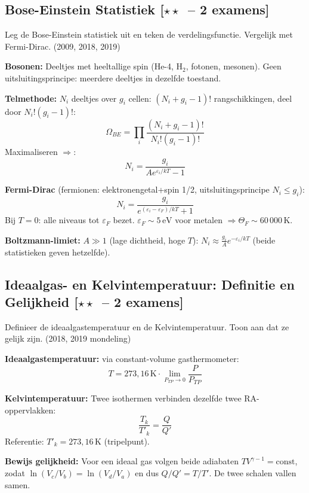 \documentclass[10pt,a4paper]{article}
\begin{document}
\subsection{Bose-Einstein Statistiek \textnormal{\color{warningred}[$\star\star$\ -- 2 examens]}}

\begin{theorievraag}{Leg de Bose-Einstein statistiek uit en teken de verdelingsfunctie. Vergelijk met Fermi-Dirac. \textnormal{(2009, 2018, 2019)}}
\end{theorievraag}

\begin{oplossing}
\textbf{Bosonen:} Deeltjes met heeltallige spin (He-4, H$_2$, fotonen, mesonen). Geen uitsluitingsprincipe: meerdere deeltjes in dezelfde toestand.

\textbf{Telmethode:} $N_i$ deeltjes over $g_i$ cellen:
$(N_i + g_i - 1)!$ rangschikkingen, deel door $N_i!(g_i-1)!$:
$$\Omega_{BE} = \prod_i \frac{(N_i+g_i-1)!}{N_i!(g_i-1)!}$$
Maximaliseren $\Rightarrow$:
$$\boxed{N_i = \frac{g_i}{Ae^{\varepsilon_i/kT}-1}}$$

\textbf{Fermi-Dirac} (fermionen: elektronengetal+spin 1/2, uitsluitingsprincipe $N_i \leq g_i$):
$$N_i = \frac{g_i}{e^{(\varepsilon_i-\varepsilon_F)/kT}+1}$$
Bij $T=0$: alle niveaus tot $\varepsilon_F$ bezet. $\varepsilon_F \sim 5\,\text{eV}$ voor metalen $\Rightarrow \Theta_F \sim 60\,000\,\text{K}$.

\textbf{Boltzmann-limiet:} $A \gg 1$ (lage dichtheid, hoge $T$): $N_i \approx \frac{g_i}{A}e^{-\varepsilon_i/kT}$ (beide statistieken geven hetzelfde).
\end{oplossing}

\subsection{Ideaalgas- en Kelvintemperatuur: Definitie en Gelijkheid \textnormal{\color{warningred}[$\star\star$\ -- 2 examens]}}

\begin{theorievraag}{Definieer de ideaalgastemperatuur en de Kelvintemperatuur. Toon aan dat ze gelijk zijn. \textnormal{(2018, 2019 mondeling)}}
\end{theorievraag}

\begin{oplossing}
\textbf{Ideaalgastemperatuur:} via constant-volume gasthermometer:
$$T = 273{,}16\,\text{K} \cdot \lim_{P_{TP}\to 0}\frac{P}{P_{TP}}$$

\textbf{Kelvintemperatuur:} Twee isothermen verbinden dezelfde twee RA-oppervlakken:
$$\frac{T_k}{T'_k} = \frac{Q}{Q'}$$
Referentie: $T'_k = 273{,}16\,\text{K}$ (tripelpunt).

\textbf{Bewijs gelijkheid:} Voor een ideaal gas volgen beide adiabaten $TV^{\gamma-1} = \text{const}$, zodat $\ln(V_c/V_b) = \ln(V_d/V_a)$ en dus $Q/Q' = T/T'$. De twee schalen vallen samen.
\end{oplossing}
\end{document}
